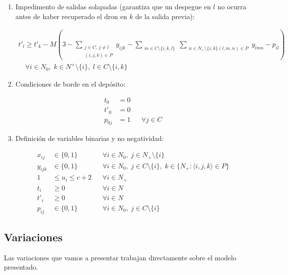 \begin{enumerate}
\item Impedimento de salidas solapadas (garantiza que un despegue en $l$ no ocurra antes de haber recuperado el dron en $k$ de la salida previa):

\begin{align*}
  t'_l \ge t'_k - M \left(3 - \sum_{\substack{j \in C,\, j \neq l \\ ( i,j,k ) \in P}} y_{ijk} - \sum_{\substack{m \in C \setminus \{i,k,l\}}} \sum_{\substack{n \in N_+ \setminus \{i,k\} (l,m,n) \in P}} y_{lmn} - p_{il}\right) \\ 
\quad \forall i \in N_0, \; k \in N^+ \setminus \{i\}, \; l \in C \setminus \{i, k\} 
\tag{23}
\end{align*}

\item Condiciones de borde en el depósito:

\begin{align*}
t_0 &= 0 \tag{24} \\
t'_0 &= 0 \tag{25} \\
p_{0j} &= 1 && \forall j \in C \tag{26}
\end{align*}

\item Definición de variables binarias y no negatividad:

\begin{align*}
x_{ij} &\in \{0, 1\} && \forall i \in N_0, \; j \in N_+ \setminus \{i\} \tag{27} \\
y_{ijk} &\in \{0, 1\} && \forall i \in N_0, \; j \in C \setminus \{i\}, \; k \in \{N_+ : \langle i,j,k \rangle \in P\} \tag{28} \\
1 &\le u_i \le c+2 && \forall i \in N_+ \tag{29} \\
t_i &\ge 0 && \forall i \in N \tag{30} \\
t'_i &\ge 0 && \forall i \in N \tag{31} \\
p_{ij} &\in \{0, 1\} && \forall i \in N_0, \; j \in C \setminus \{i\} \tag{32}
\end{align*}

\end{enumerate}

\subsection{Variaciones}

Las variaciones que vamos a presentar trabajan directamente sobre el modelo presentado.

